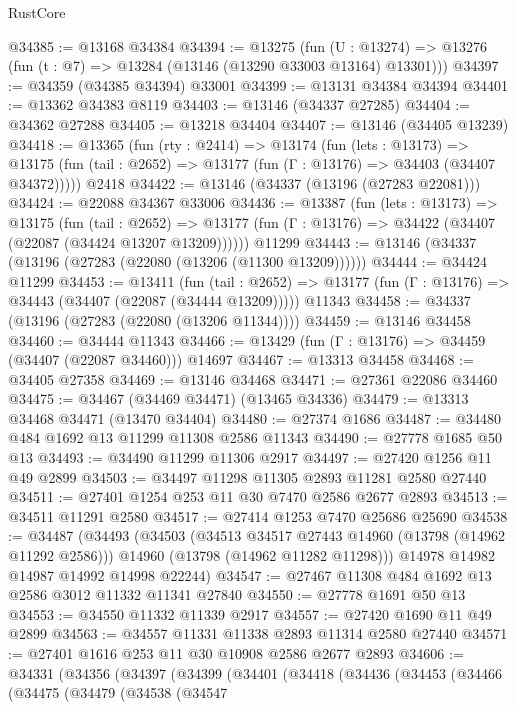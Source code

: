 \begin{lexlean}{RustCore}
\begin{coremodule}
@34385 := @13168 @34384
@34394 := @13275
    (fun (U : @13274) => @13276 (fun (t : @7) => @13284 (@13146 (@13290 @33003 @13164) @13301)))
@34397 := @34359 (@34385 @34394) @33001
@34399 := @13131 @34384 @34394
@34401 := @13362 @34383 @8119
@34403 := @13146 (@34337 @27285)
@34404 := @34362 @27288
@34405 := @13218 @34404
@34407 := @13146 (@34405 @13239)
@34418 := @13365
    (fun (rty : @2414) =>
    @13174
      (fun (lets : @13173) =>
      @13175 (fun (tail : @2652) => @13177 (fun (Γ : @13176) => @34403 (@34407 @34372)))))
    @2418
@34422 := @13146 (@34337 (@13196 (@27283 @22081)))
@34424 := @22088 @34367 @33006
@34436 := @13387
    (fun (lets : @13173) =>
    @13175
      (fun (tail : @2652) =>
      @13177 (fun (Γ : @13176) => @34422 (@34407 (@22087 (@34424 @13207 @13209))))))
    @11299
@34443 := @13146 (@34337 (@13196 (@27283 (@22080 (@13206 (@11300 @13209))))))
@34444 := @34424 @11299
@34453 := @13411
    (fun (tail : @2652) => @13177 (fun (Γ : @13176) => @34443 (@34407 (@22087 (@34444 @13209)))))
    @11343
@34458 := @34337 (@13196 (@27283 (@22080 (@13206 @11344))))
@34459 := @13146 @34458
@34460 := @34444 @11343
@34466 := @13429 (fun (Γ : @13176) => @34459 (@34407 (@22087 @34460))) @14697
@34467 := @13313 @34458
@34468 := @34405 @27358
@34469 := @13146 @34468
@34471 := @27361 @22086 @34460
@34475 := @34467 (@34469 @34471) (@13465 @34336)
@34479 := @13313 @34468 @34471 (@13470 @34404)
@34480 := @27374 @1686
@34487 := @34480 @484 @1692 @13 @11299 @11308 @2586 @11343
@34490 := @27778 @1685 @50 @13
@34493 := @34490 @11299 @11306 @2917
@34497 := @27420 @1256 @11 @49 @2899
@34503 := @34497 @11298 @11305 @2893 @11281 @2580 @27440
@34511 := @27401 @1254 @253 @11 @30 @7470 @2586 @2677 @2893
@34513 := @34511 @11291 @2580
@34517 := @27414 @1253 @7470 @25686 @25690
@34538 := @34487
    (@34493
      (@34503
        (@34513 @34517 @27443 @14960 (@13798 (@14962 @11292 @2586)))
        @14960
        (@13798 (@14962 @11282 @11298)))
      @14978
      @14982
      @14987
      @14992
      @14998
      @22244)
@34547 := @27467 @11308 @484 @1692 @13 @2586 @3012 @11332 @11341 @27840
@34550 := @27778 @1691 @50 @13
@34553 := @34550 @11332 @11339 @2917
@34557 := @27420 @1690 @11 @49 @2899
@34563 := @34557 @11331 @11338 @2893 @11314 @2580 @27440
@34571 := @27401 @1616 @253 @11 @30 @10908 @2586 @2677 @2893
@34606 := @34331
    (@34356
      (@34397
        (@34399
          (@34401
            (@34418
              (@34436
                (@34453
                  (@34466
                    (@34475
                      (@34479
                        (@34538
                          (@34547

\end{coremodule}
\end{lexlean}
